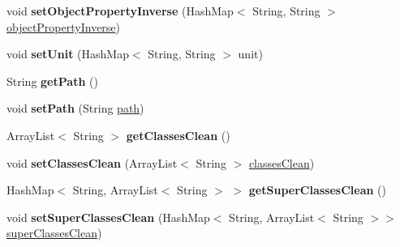 \begin{DoxyCompactItemize}
\item 
\hypertarget{class_data_base_1_1_tables_ab7b2b1a4677f45c667d96dc78d90f75c}{
void {\bfseries setObjectPropertyInverse} (HashMap$<$ String, String $>$ \hyperlink{class_data_base_1_1_tables_a0465d81797980577fb423e6140df7110}{objectPropertyInverse})}
\label{class_data_base_1_1_tables_ab7b2b1a4677f45c667d96dc78d90f75c}

\item 
\hypertarget{class_data_base_1_1_tables_aac3363f33a78dfb20c0b35d62f235466}{
void {\bfseries setUnit} (HashMap$<$ String, String $>$ unit)}
\label{class_data_base_1_1_tables_aac3363f33a78dfb20c0b35d62f235466}

\item 
\hypertarget{class_data_base_1_1_tables_a8a61618eb515452b8733444e53b81df0}{
String {\bfseries getPath} ()}
\label{class_data_base_1_1_tables_a8a61618eb515452b8733444e53b81df0}

\item 
\hypertarget{class_data_base_1_1_tables_a6aea1cbfa10e74a6685cff1f3d385ac2}{
void {\bfseries setPath} (String \hyperlink{class_data_base_1_1_tables_ae80958e71da9b7fc4bf4e138f377b59f}{path})}
\label{class_data_base_1_1_tables_a6aea1cbfa10e74a6685cff1f3d385ac2}

\item 
\hypertarget{class_data_base_1_1_tables_a5702f3e8af3ff4bc84fc1ef41fa0e0a7}{
ArrayList$<$ String $>$ {\bfseries getClassesClean} ()}
\label{class_data_base_1_1_tables_a5702f3e8af3ff4bc84fc1ef41fa0e0a7}

\item 
\hypertarget{class_data_base_1_1_tables_abe8fc506b7962781ddf7cddef5a6d585}{
void {\bfseries setClassesClean} (ArrayList$<$ String $>$ \hyperlink{class_data_base_1_1_tables_a780c97151dcb24984456109f95ebc22d}{classesClean})}
\label{class_data_base_1_1_tables_abe8fc506b7962781ddf7cddef5a6d585}

\item 
\hypertarget{class_data_base_1_1_tables_a035577fea0b42cd1c7206ba4a6f993d2}{
HashMap$<$ String, ArrayList$<$ String $>$ $>$ {\bfseries getSuperClassesClean} ()}
\label{class_data_base_1_1_tables_a035577fea0b42cd1c7206ba4a6f993d2}

\item 
\hypertarget{class_data_base_1_1_tables_a071416b903aa78a5ad3c2e97673e660e}{
void {\bfseries setSuperClassesClean} (HashMap$<$ String, ArrayList$<$ String $>$$>$ \hyperlink{class_data_base_1_1_tables_a5ec0af78ac892df612bf3ea7a91e37c5}{superClassesClean})}
\label{class_data_base_1_1_tables_a071416b903aa78a5ad3c2e97673e660e}


\end{DoxyCompactItemize}
